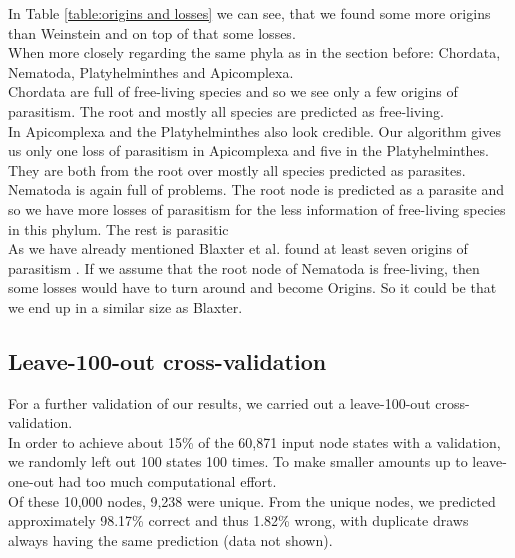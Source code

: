         In Table \ref{table:origins and losses} we can see, that we found some more origins than Weinstein 
          and on top of that some losses. \\

        When more closely regarding the same phyla as in the section before: Chordata, Nematoda, 
          Platyhelminthes and Apicomplexa. \\
        Chordata are full of free-living species and so we see only a few origins of parasitism. The root
        and mostly all species are predicted as free-living. \\
        In Apicomplexa and the Platyhelminthes also look credible. Our algorithm gives us only one loss of
          parasitism in Apicomplexa and five in the Platyhelminthes. They are both from the root over
          mostly all species predicted as parasites. \\
        Nematoda is again full of problems. The root node is predicted as a parasite and so we have more 
          losses of parasitism for the less information of free-living species in this phylum. The rest 
          is parasitic \\
        As we have already mentioned Blaxter et al. found at least seven origins of parasitism 
          \cite{Blaxter1998}. If we assume that the root node of Nematoda is free-living, then some 
          losses would have to turn around and become Origins. So it could be that we end up in a similar 
          size as Blaxter.
      
    \subsection{Leave-100-out cross-validation} \label{sec:results - cross-validation}
      For a further validation of our results, we carried out a leave-100-out cross-validation. \\
      In order to achieve about 15\% of the 60,871 input node states with a validation, 
        we randomly left out 100 states 100 times. To make smaller amounts up to leave-one-out had too 
        much computational effort. \\
        
      Of these 10,000 nodes, 9,238 were unique. From the unique nodes, we predicted approximately 
        98.17\% correct and thus 1.82\% wrong, with duplicate draws always having the same prediction 
        (data not shown). \\
      
